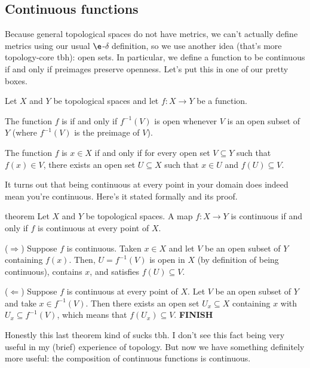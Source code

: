 \documentclass[class=article, crop=false]{standalone}
\begin{document}
\subsection{Continuous functions}

Because general topological spaces do not have metrics, we can't actually define metrics using our usual $\e$-$\delta$ definition, so we use another idea (that's more topology-core tbh): open sets. In particular, we define a function to be continuous if and only if preimages preserve openness. Let's put this in one of our pretty boxes.
\begin{defn}[Continuity]
  Let $X$ and $Y$ be topological spaces and let $f \colon X \to Y$ be a function.

  The function $f$ is  if and only if $f^{-1}(V)$ is open whenever $V$ is an open subset of $Y$ (where $f^{-1}(V)$ is the preimage of $V$).

  The function $f$ is  $x \in X$ if and only if for every open set $V \subseteq Y$ such that $f(x) \in V$, there exists an open set $U \subseteq X$ such that $x \in U$ and $f(U) \subseteq V$.
\end{defn}

It turns out that being continuous at every point in your domain does indeed mean you're continuous. Here's it stated formally and its proof.

\begin{result}{theorem}
  Let $X$ and $Y$ be topological spaces. A map $f \colon X \to Y$ is continuous if and only if $f$ is continuous at every point of $X$.
\end{result}
\begin{pf}
  ($\Rightarrow$) Suppose $f$ is continuous. Taken $x \in X$ and let $V$ be an open subset of $Y$ containing $f(x)$. Then, $U = f^{-1}(V)$ is open in $X$ (by definition of being continuous), contains $x$, and satisfies $f(U) \subseteq V$.

  ($\Leftarrow$) Suppose $f$ is continuous at every point of $X$. Let $V$ be an open subset of $Y$ and take $x \in f^{-1}(V)$. Then there exists an open set $U_x \subseteq X$ containing $x$ with $U_x \subseteq f^{-1}(V)$, which means that $f(U_x) \subseteq V$. \textbf{FINISH}
\end{pf}

Honestly this last theorem kind of sucks tbh. I don't see this fact being very useful in my (brief) experience of topology. But now we have something definitely more useful: the composition of continuous functions is continuous.
\end{document}
